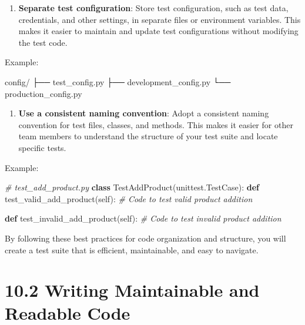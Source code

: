 \documentclass[
  paper=a4,
  ,captions=tableheading
]{scrartcl}
\newenvironment{Shaded}{}{}
\newcommand{\CommentTok}[1]{\textcolor[rgb]{0.38,0.63,0.69}{\textit{#1}}}
\newcommand{\KeywordTok}[1]{\textcolor[rgb]{0.00,0.44,0.13}{\textbf{#1}}}
\newcommand{\NormalTok}[1]{#1}
\newcommand{\VariableTok}[1]{\textcolor[rgb]{0.10,0.09,0.49}{#1}}
\providecommand{\tightlist}{%
  \setlength{\itemsep}{0pt}\setlength{\parskip}{0pt}}
\begin{document}
\begin{enumerate}
\def\labelenumi{\arabic{enumi}.}
\setcounter{enumi}{2}
\tightlist
\item
  \textbf{Separate test configuration}: Store test configuration, such
  as test data, credentials, and other settings, in separate files or
  environment variables. This makes it easier to maintain and update
  test configurations without modifying the test code.
\end{enumerate}

Example:

\begin{Shaded}
\begin{Highlighting}[]

\NormalTok{config/}
\NormalTok{  ├── test\_config.py}
\NormalTok{  ├── development\_config.py}
\NormalTok{  └── production\_config.py}
\end{Highlighting}
\end{Shaded}

\begin{enumerate}
\def\labelenumi{\arabic{enumi}.}
\setcounter{enumi}{3}
\tightlist
\item
  \textbf{Use a consistent naming convention}: Adopt a consistent naming
  convention for test files, classes, and methods. This makes it easier
  for other team members to understand the structure of your test suite
  and locate specific tests.
\end{enumerate}

Example:

\begin{Shaded}
\begin{Highlighting}[]
\CommentTok{\# test\_add\_product.py}
\KeywordTok{class}\NormalTok{ TestAddProduct(unittest.TestCase):}
    \KeywordTok{def}\NormalTok{ test\_valid\_add\_product(}\VariableTok{self}\NormalTok{):}
        \CommentTok{\# Code to test valid product addition}

    \KeywordTok{def}\NormalTok{ test\_invalid\_add\_product(}\VariableTok{self}\NormalTok{):}
        \CommentTok{\# Code to test invalid product addition}
\end{Highlighting}
\end{Shaded}

By following these best practices for code organization and structure,
you will create a test suite that is efficient, maintainable, and easy
to navigate.

\hypertarget{writing-maintainable-and-readable-code}{%
\section{10.2 Writing Maintainable and Readable
Code}\label{writing-maintainable-and-readable-code}}
\end{document}
